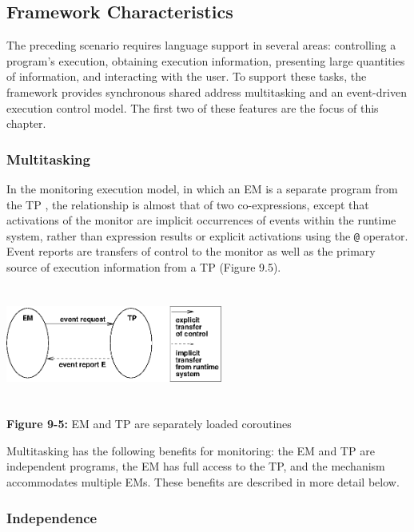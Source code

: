 \subsection{Framework Characteristics}

The preceding scenario requires language support in several areas:
controlling a program's execution, obtaining execution information,
presenting large quantities of information, and interacting with the user.
To support these tasks, the framework provides synchronous shared address
multitasking and an event-driven execution control model.
 The first two of these features are the focus
of this chapter.

\subsubsection*{Multitasking}

In the monitoring execution model, in which an EM is a separate program
from the TP , the relationship is almost
that of two co-expressions, except that activations of the monitor are
implicit occurrences of events within the runtime system, rather than
expression results or explicit activations using the \texttt{@} operator.
Event reports are transfers of control to the monitor as well as the
primary source of execution information from a TP (Figure 9.5).

\begin{center}
\includegraphics[width=2.8in,height=1.5in]{execinf.png}
\end{center}

{\sffamily\bfseries Figure 9-5:}
{\sffamily EM and TP are separately loaded coroutines}

\bigskip


Multitasking has the following benefits for monitoring: the EM and TP are
independent programs, the EM has full access to the TP, and the mechanism
accommodates multiple EMs.  These benefits are described in more detail
below.


\subsubsection*{Independence}

